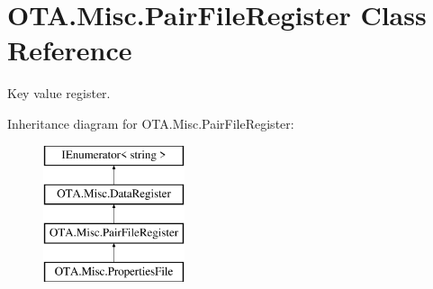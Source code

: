 \hypertarget{class_o_t_a_1_1_misc_1_1_pair_file_register}{}\section{O\+T\+A.\+Misc.\+Pair\+File\+Register Class Reference}
\label{class_o_t_a_1_1_misc_1_1_pair_file_register}


Key value register.  


Inheritance diagram for O\+T\+A.\+Misc.\+Pair\+File\+Register\+:\begin{figure}[H]
\begin{center}
\leavevmode
\includegraphics[height=4.000000cm]{class_o_t_a_1_1_misc_1_1_pair_file_register}
\end{center}
\end{figure}
